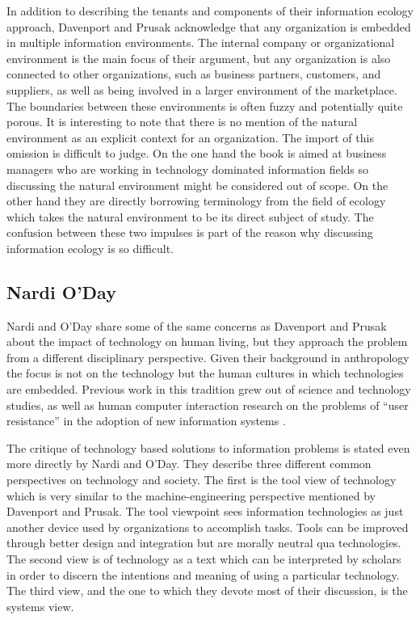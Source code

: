 In addition to describing the tenants and components of their information ecology approach, Davenport and Prusak acknowledge that any organization is embedded in multiple information environments. The internal company or organizational environment is the main focus of their argument, but any organization is also connected to other organizations, such as business partners, customers, and suppliers, as well as being involved in a larger environment of the marketplace. The boundaries between these environments is often fuzzy and potentially quite porous. It is interesting to note that there is no mention of the natural environment as an explicit context for an organization. The import of this omission is difficult to judge. On the one hand the book is aimed at business managers who are working in technology dominated information fields so discussing the natural environment might be considered out of scope. On the other hand they are directly borrowing terminology from the field of ecology which takes the natural environment to be its direct subject of study. The confusion between these two impulses is part of the reason why discussing information ecology is so difficult.

\subsection{Nardi O'Day}

Nardi and O'Day share some of the same concerns as Davenport and Prusak about the impact of technology on human living, but they approach the problem from a different disciplinary perspective. Given their background in anthropology the focus is not on the technology but the human cultures in which technologies are embedded. Previous work in this tradition grew out of science and technology studies, as well as human computer interaction research on the problems of ``user resistance'' in the adoption of new information systems \citep{star_1996}.

The critique of technology based solutions to information problems is stated even more directly by Nardi and O'Day. They describe three different common perspectives on technology and society. The first is the tool view of technology which is very similar to the machine-engineering perspective mentioned by Davenport and Prusak. The tool viewpoint sees information technologies as just another device used by organizations to accomplish tasks. Tools can be improved through better design and integration but are morally neutral qua technologies. The second view is of technology as a text which can be interpreted by scholars in order to discern the intentions and meaning of using a particular technology. The third view, and the one to which they devote most of their discussion, is the systems view.

